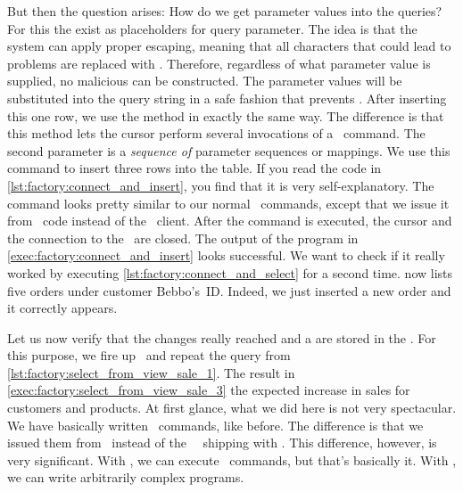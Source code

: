 But then the question arises:
How do we get parameter values into the queries?
For this the  exist as placeholders for query parameter.
The idea is that the system can apply proper escaping, meaning that all characters that could lead to problems are replaced with .
Therefore, regardless of what parameter value is supplied, no malicious can be constructed.
The parameter values will be substituted into the query string in a safe fashion that prevents .%
%
%
\endhsection
%
%
After inserting this one row, we use the  method in exactly the same way.
The difference is that this method lets the cursor perform several invocations of a \sql\ command.
The second parameter is a \emph{sequence of} parameter sequences or mappings.
We use this command to insert three rows into the  table.
If you read the code in \cref{lst:factory:connect_and_insert}, you find that it is very self-explanatory.
The command looks pretty similar to our normal \sql\ commands, except that we issue it from \python\ code instead of the \psql\ client.%
%
After the command is executed, the cursor and the connection to the \db\ are closed.
The output of the program in \cref{exec:factory:connect_and_insert} looks successful.
\endhsection%
%
%
We want to check if it really worked by executing \cref{lst:factory:connect_and_select} for a second time.
 now lists five orders under customer Bebbo's~ID.
Indeed, we just inserted a new order and it correctly appears.

%
%
%
Let us now verify that the changes really reached and a are stored in the \db.
For this purpose, we fire up \psql\ and repeat the query from \cref{lst:factory:select_from_view_sale_1}.
The result in \cref{exec:factory:select_from_view_sale_3} the expected increase in sales for customers and products.%
%
\endhsection%
\endhsection%
%
%
At first glance, what we did here is not very spectacular.
We have basically written \sql\ commands, like before.
The difference is that we issued them from \python\ instead of the \psql\ \client\ shipping with \postgresql.
This difference, however, is very significant.
With \psql, we can execute \sql\ commands, but that's basically it.
With \python, we can write arbitrarily complex programs.

